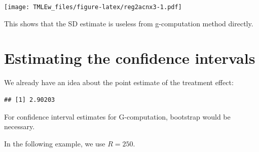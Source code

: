 \documentclass[
]{book}
\newenvironment{Shaded}{\begin{snugshade}}{\end{snugshade}}
\newcommand{\AttributeTok}[1]{\textcolor[rgb]{0.77,0.63,0.00}{#1}}
\newcommand{\DecValTok}[1]{\textcolor[rgb]{0.00,0.00,0.81}{#1}}
\newcommand{\FunctionTok}[1]{\textcolor[rgb]{0.00,0.00,0.00}{#1}}
\newcommand{\NormalTok}[1]{#1}
\newcommand{\SpecialCharTok}[1]{\textcolor[rgb]{0.00,0.00,0.00}{#1}}
\newcommand{\StringTok}[1]{\textcolor[rgb]{0.31,0.60,0.02}{#1}}
\begin{document}
\begin{Shaded}
\end{Shaded}

\texttt{[image: TMLEw\_files/figure-latex/reg2acnx3-1.pdf]}

This shows that the SD estimate is useless from g-computation method directly.

\hypertarget{estimating-the-confidence-intervals}{%
\section{Estimating the confidence intervals}\label{estimating-the-confidence-intervals}}

We already have an idea about the point estimate of the treatment effect:

\begin{Shaded}
\end{Shaded}

\begin{verbatim}
## [1] 2.90203
\end{verbatim}

\begin{rmdcomment}
For confidence interval estimates for G-computation, bootstrap would be
necessary.
\end{rmdcomment}

In the following example, we use \(R = 250\).
\end{document}
